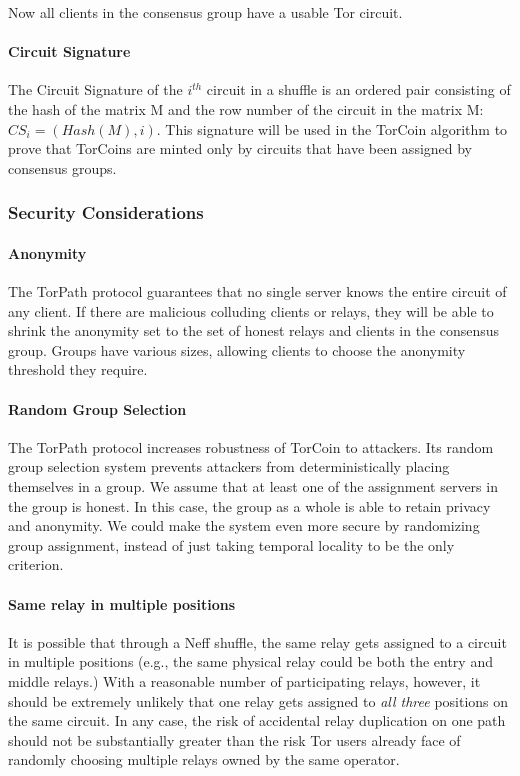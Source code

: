 Now all clients in the consensus group have a usable Tor circuit.



\paragraph{Circuit Signature} The Circuit Signature of the $i^{th}$ circuit in
a shuffle is an ordered pair consisting of the hash of the matrix M and the
row number of the circuit in the matrix M: $CS_i = (Hash(M), i)$. This
signature will be used in the TorCoin algorithm to prove that TorCoins are
minted only by circuits that have been assigned by consensus groups.

\subsubsection{Security Considerations} 

\paragraph{Anonymity} The TorPath protocol guarantees that no single
server knows the entire circuit of any client. If there are malicious
colluding clients or relays, they will be able to shrink the anonymity set to
the set of honest relays and clients in the consensus group.  Groups have
various sizes, allowing clients to choose the anonymity threshold they
require.

\paragraph{Random Group Selection} The TorPath protocol increases
robustness of TorCoin to attackers. Its random group selection system prevents
attackers from deterministically placing themselves in a group. We assume that
at least one of the assignment servers in the group is honest. In this case,
the group as a whole is able to retain privacy and anonymity. We could make
the system even more secure by randomizing group assignment, instead of just
taking temporal locality to be the only criterion.

\paragraph{Same relay in multiple positions}  It is possible that through
a Neff shuffle, the same relay gets assigned to a circuit in multiple
positions (e.g., the same physical relay could be both the entry and middle
relays.) With a reasonable number of participating relays, however,
it should be extremely unlikely that one relay gets assigned
to {\em all three} positions on the same circuit.
In any case, the risk of accidental relay duplication on one path
should not be substantially greater than the risk
Tor users already face of randomly choosing multiple relays
owned by the same operator.
